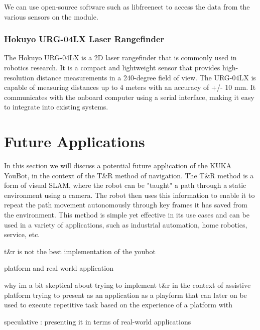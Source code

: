 \documentclass[a4paper, 12pt]{article}
\newif\ifshownotes
\newcommand{\notes}[1]{\ifshownotes\textcolor{blue}{#1}\fi}
\begin{document}
    We can use open-source software such as libfreenect to access the data from the various sensors on the module.


    \notes{discuss the libfreenect library, how to install it, and how it could be used within ROS.}


    \subsubsection{Hokuyo URG-04LX Laser Rangefinder}

    The Hokuyo URG-04LX is a 2D laser rangefinder that is commonly used in robotics research. It is a compact and lightweight sensor that provides high-resolution distance measurements in a 240-degree field of view. The URG-04LX is capable of measuring distances up to 4 meters with an accuracy of +/- 10 mm. It communicates with the onboard computer using a serial interface, making it easy to integrate into existing systems.

    \notes{discuss installing the drivers and whatnot, and how to use it within ROS and rqt.}

    \pagebreak

    \section{Future Applications}

    In this section we will discuss a potential future application of the KUKA YouBot, in the context of the T\&R method of navigation. The T\&R method is a form of visual SLAM, where the robot can be "taught" a path through a static environment using a camera. The robot then uses this information to enable it to repeat the path movement autonomously through key frames it has saved from the environment. This method is simple yet effective in its use cases and can be used in a variety of applications, such as industrial automation, home robotics, service, etc.

    t\&r is not the best implementation of the youbot
    
    platform and real world application

    why im a bit skeptical about 
    trying to implement t\&r in the context of assistive platform 
    trying to present as an application as a playform that can later on be used to execute repetitive task based on the experience of a platform with 

    speculative : presenting it in terms of real-world applications
\end{document}
